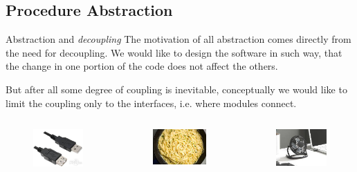 \subsection{Procedure Abstraction}
\begin{frame}{Abstraction and \textit{decoupling}}
The motivation of all abstraction comes directly from the need for decoupling. We would like to design the software in such way, that the change in one portion of the code does not affect the others.

\vspace{0.1in}
But after all some degree of coupling is inevitable, conceptually we would like to limit the coupling only to the interfaces, i.e. where modules connect.

\begin{columns}
	\begin{figure}
		\centering
		\includegraphics[scale=0.34]{fig/low-coupling}
	\end{figure}
	\begin{figure}
		\centering
		\includegraphics[scale=0.35]{fig/high-coupling}
	\end{figure}
	\begin{figure}
		\centering
		\includegraphics[scale=0.33]{fig/low-coupling-flex}
	\end{figure}
\end{columns}

\end{frame}

